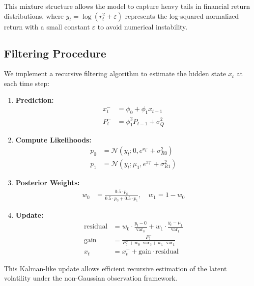 This mixture structure allows the model to capture heavy tails in financial return distributions, where $y_t = \log(r_t^2 + \varepsilon)$ represents the log-squared normalized return with a small constant $\varepsilon$ to avoid numerical instability.

\subsection{Filtering Procedure}

We implement a recursive filtering algorithm to estimate the hidden state $x_t$ at each time step:

\begin{enumerate}
    \item \textbf{Prediction:}
    \begin{align}
        x_t^- &= \phi_0 + \phi_1 x_{t-1} \\
        P_t^- &= \phi_1^2 P_{t-1} + \sigma_Q^2
    \end{align}
    
    \item \textbf{Compute Likelihoods:}
    \begin{align}
        p_0 &= \mathcal{N}(y_t; 0, e^{x_t^-} + \sigma_{R0}^2) \\
        p_1 &= \mathcal{N}(y_t; \mu_1, e^{x_t^-} + \sigma_{R1}^2)
    \end{align}
    
    \item \textbf{Posterior Weights:}
    \begin{align}
        w_0 &= \frac{0.5 \cdot p_0}{0.5 \cdot p_0 + 0.5 \cdot p_1}, \quad w_1 = 1 - w_0
    \end{align}
    
    \item \textbf{Update:}
    \begin{align}
        \text{residual} &= w_0 \cdot \frac{y_t - 0}{\text{var}_0} + w_1 \cdot \frac{y_t - \mu_1}{\text{var}_1} \\
        \text{gain} &= \frac{P_t^-}{P_t^- + w_0 \cdot \text{var}_0 + w_1 \cdot \text{var}_1} \\
        x_t &= x_t^- + \text{gain} \cdot \text{residual}
    \end{align}
\end{enumerate}

This Kalman-like update allows efficient recursive estimation of the latent volatility under the non-Gaussian observation framework.

